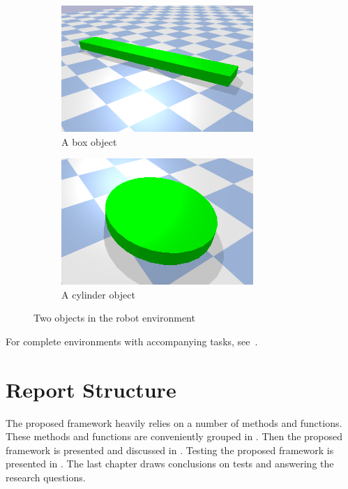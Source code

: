 \begin{figure}[H]
    \centering
    \begin{subfigure}{.5\textwidth}
    \centering
    \includegraphics[width=0.8\textwidth]{figures/introduction/box_object.png}
    \caption{A box object}
    \end{subfigure}%
    \begin{subfigure}{.5\textwidth}
    \centering
    \includegraphics[width=0.8\textwidth]{figures/introduction/cylinder_object.png}
    \caption{A cylinder object}
    \end{subfigure}%
    \caption{Two objects in the robot environment}%
    \label{fig:example_objects}
\end{figure}

For complete environments with accompanying tasks, see~.\bs

\section{Report Structure}%
\label{sec:report_structure}
The proposed framework heavily relies on a number of methods and functions. These methods and functions are conveniently grouped in . Then the proposed framework is presented and discussed in . Testing the proposed framework is presented in . The last chapter draws conclusions on tests and answering the research questions.\bs
